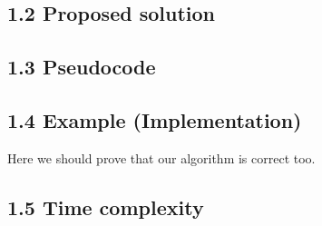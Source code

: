 \documentclass{article}
\begin{document}
\subsection*{1.2 Proposed solution}

\subsection*{1.3 Pseudocode}

\subsection*{1.4 Example (Implementation)}

Here we should prove that our algorithm is correct too.

\subsection*{1.5 Time complexity}
\end{document}
